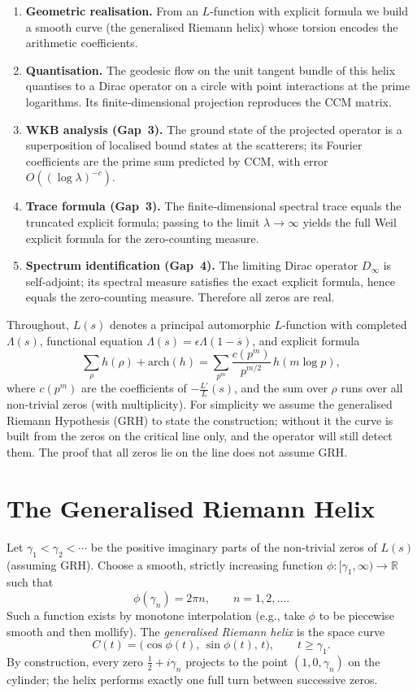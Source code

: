\documentclass[12pt,a4paper]{article}
\newcommand{\R}{\mathbb{R}}
\begin{document}
\begin{enumerate}[label=(\arabic*)]
\item \textbf{Geometric realisation.}  From an $L$-function with explicit formula we build a smooth curve (the generalised Riemann helix) whose torsion encodes the arithmetic coefficients.
\item \textbf{Quantisation.}  The geodesic flow on the unit tangent bundle of this helix quantises to a Dirac operator on a circle with point interactions at the prime logarithms.  Its finite‑dimensional projection reproduces the CCM matrix.
\item \textbf{WKB analysis (Gap~3).}  The ground state of the projected operator is a superposition of localised bound states at the scatterers; its Fourier coefficients are the prime sum predicted by CCM, with error $O((\log\lambda)^{-c})$.
\item \textbf{Trace formula (Gap~3).}  The finite‑dimensional spectral trace equals the truncated explicit formula; passing to the limit $\lambda\to\infty$ yields the full Weil explicit formula for the zero‑counting measure.
\item \textbf{Spectrum identification (Gap~4).}  The limiting Dirac operator $D_\infty$ is self‑adjoint; its spectral measure satisfies the exact explicit formula, hence equals the zero‑counting measure.  Therefore all zeros are real.
\end{enumerate}

Throughout, $L(s)$ denotes a principal automorphic $L$-function with completed $\Lambda(s)$, functional equation $\Lambda(s) = \epsilon \Lambda(1-\overline{s})$, and explicit formula
\begin{equation}\label{eq:explicit}
\sum_{\rho} h(\rho) + \text{arch}(h) = \sum_{p^m} \frac{c(p^m)}{p^{m/2}} \, h(m\log p),
\end{equation}
where $c(p^m)$ are the coefficients of $-\frac{L'}{L}(s)$, and the sum over $\rho$ runs over all non‑trivial zeros (with multiplicity).  For simplicity we assume the generalised Riemann Hypothesis (GRH) to state the construction; without it the curve is built from the zeros on the critical line only, and the operator will still detect them.  The proof that all zeros lie on the line does not assume GRH.

\section{The Generalised Riemann Helix}
Let $\gamma_1 < \gamma_2 < \cdots$ be the positive imaginary parts of the non‑trivial zeros of $L(s)$ (assuming GRH).  Choose a smooth, strictly increasing function $\phi:[\gamma_1,\infty)\to\R$ such that
\[
\phi(\gamma_n) = 2\pi n,\qquad n=1,2,\dots .
\]
Such a function exists by monotone interpolation (e.g., take $\phi$ to be piecewise smooth and then mollify).  The \emph{generalised Riemann helix} is the space curve
\[
C(t) = \bigl(\cos\phi(t),\,\sin\phi(t),\,t\bigr),\qquad t\ge \gamma_1.
\]
By construction, every zero $\frac12+i\gamma_n$ projects to the point $(1,0,\gamma_n)$ on the cylinder; the helix performs exactly one full turn between successive zeros.
\end{document}
